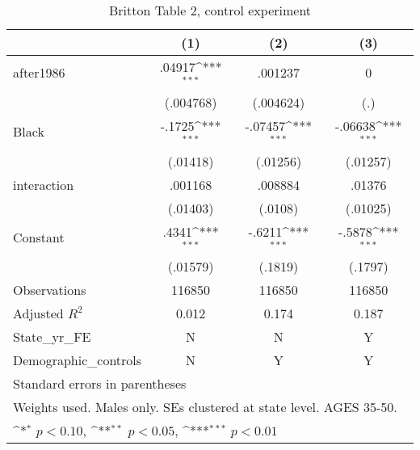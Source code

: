 \begin{table}[htbp]\centering
\def\sym#1{\ifmmode^{#1}\else\(^{#1}\)\fi}
\caption{Britton Table 2, control experiment}
\begin{tabular}{l*{3}{c}}
\hline\hline
                    &\multicolumn{1}{c}{(1)}         &\multicolumn{1}{c}{(2)}         &\multicolumn{1}{c}{(3)}         \\
\hline
after1986           &      .04917\sym{***}&     .001237         &           0         \\
                    &   (.004768)         &   (.004624)         &         (.)         \\
[1em]
Black               &      -.1725\sym{***}&     -.07457\sym{***}&     -.06638\sym{***}\\
                    &    (.01418)         &    (.01256)         &    (.01257)         \\
[1em]
interaction         &     .001168         &     .008884         &      .01376         \\
                    &    (.01403)         &     (.0108)         &    (.01025)         \\
[1em]
Constant            &       .4341\sym{***}&      -.6211\sym{***}&      -.5878\sym{***}\\
                    &    (.01579)         &     (.1819)         &     (.1797)         \\
\hline
Observations        &      116850         &      116850         &      116850         \\
Adjusted \(R^{2}\)  &       0.012         &       0.174         &       0.187         \\
State\_yr\_FE         &           N         &           N         &           Y         \\
Demographic\_controls&           N         &           Y         &           Y         \\
\hline\hline
\multicolumn{4}{l}{\footnotesize Standard errors in parentheses}\\
\multicolumn{4}{l}{\footnotesize Weights used. Males only. SEs clustered at state level. AGES 35-50.}\\
\multicolumn{4}{l}{\footnotesize \sym{*} \(p<0.10\), \sym{**} \(p<0.05\), \sym{***} \(p<0.01\)}\\
\end{tabular}
\end{table}
